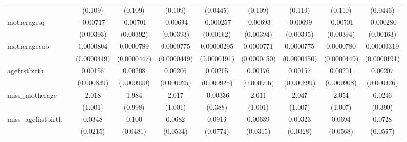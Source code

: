 \begin{table}[htbp]
\begin{tabular}{l*{9}{c}}
            &                     &     (0.109)         &     (0.109)         &     (0.109)         &    (0.0445)         &     (0.109)         &     (0.110)         &     (0.110)         &    (0.0446)         \\
[1em]
motheragesq &                     &    -0.00717\sym{*}  &    -0.00701\sym{*}  &    -0.00694\sym{*}  &   -0.000257         &    -0.00693\sym{*}  &    -0.00699\sym{*}  &    -0.00701\sym{*}  &   -0.000280         \\
            &                     &   (0.00393)         &   (0.00392)         &   (0.00393)         &   (0.00162)         &   (0.00394)         &   (0.00395)         &   (0.00394)         &   (0.00163)         \\
[1em]
motheragecub&                     &   0.0000804\sym{*}  &   0.0000789\sym{*}  &   0.0000775\sym{*}  &  0.00000295         &   0.0000771\sym{*}  &   0.0000775\sym{*}  &   0.0000780\sym{*}  &  0.00000319         \\
            &                     & (0.0000449)         & (0.0000447)         & (0.0000449)         & (0.0000191)         & (0.0000450)         & (0.0000450)         & (0.0000449)         & (0.0000191)         \\
[1em]
agefirstbirth&                     &     0.00155\sym{*}  &     0.00208\sym{**} &     0.00206\sym{**} &     0.00205\sym{**} &     0.00176\sym{*}  &     0.00167\sym{*}  &     0.00201\sym{**} &     0.00207\sym{**} \\
            &                     &  (0.000839)         &  (0.000900)         &  (0.000925)         &  (0.000925)         &  (0.000916)         &  (0.000899)         &  (0.000908)         &  (0.000926)         \\
[1em]
miss\_motherage&                     &       2.018\sym{**} &       1.984\sym{**} &       2.017\sym{**} &    -0.00336         &       2.011\sym{**} &       2.047\sym{**} &       2.054\sym{**} &      0.0246         \\
            &                     &     (1.001)         &     (0.998)         &     (1.001)         &     (0.388)         &     (1.001)         &     (1.007)         &     (1.007)         &     (0.390)         \\
[1em]
miss\_agefirstbirth&                     &      0.0348         &       0.100\sym{**} &      0.0682         &      0.0916         &     0.00689         &     0.00323         &      0.0694         &      0.0728         \\
            &                     &    (0.0215)         &    (0.0481)         &    (0.0534)         &    (0.0774)         &    (0.0315)         &    (0.0328)         &    (0.0568)         &    (0.0567)         \\

\end{tabular}
\end{table}
